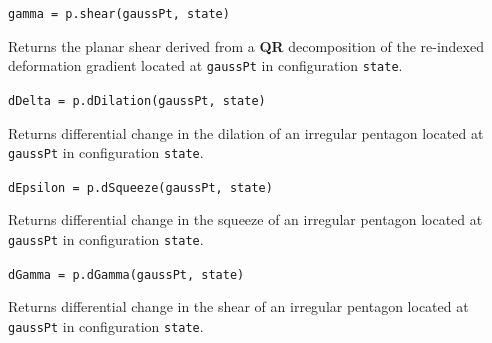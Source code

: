 \medskip\noindent
\texttt{gamma = p.shear(gaussPt, state)}

\medskip\noindent
Returns the planar shear derived from a \textbf{QR} decomposition of the re-indexed deformation gradient located at \texttt{gaussPt} in configuration \texttt{state}.

\medskip\noindent
\texttt{dDelta = p.dDilation(gaussPt, state)}

\medskip\noindent
Returns differential change in the dilation of an irregular pentagon located at \texttt{gaussPt} in configuration \texttt{state}.

\newpage
\medskip\noindent
\texttt{dEpsilon = p.dSqueeze(gaussPt, state)}

\medskip\noindent
Returns differential change in the squeeze of an irregular pentagon located at \texttt{gaussPt} in configuration \texttt{state}.

\medskip\noindent
\texttt{dGamma = p.dGamma(gaussPt, state)}

\medskip\noindent
Returns differential change in the shear of an irregular pentagon located at \texttt{gaussPt} in configuration \texttt{state}.
